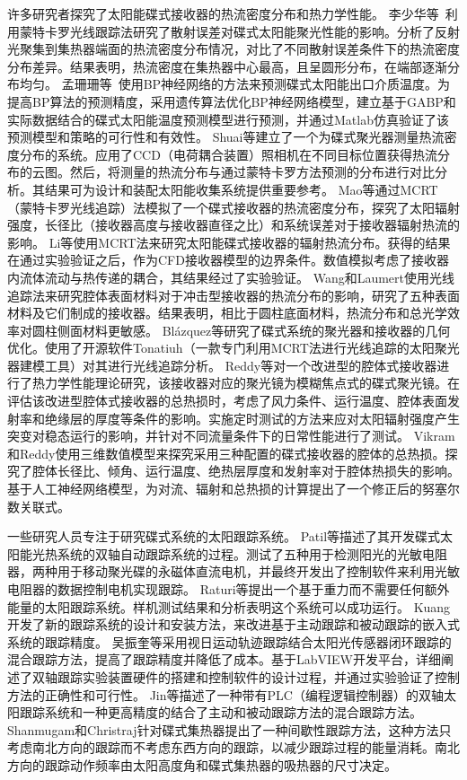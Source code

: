 许多研究者探究了太阳能碟式接收器的热流密度分布和热力学性能。
李少华等~\cite{Li2017}利用蒙特卡罗光线跟踪法研究了散射误差对碟式太阳能聚光性能的影响。分析了反射光聚集到集热器端面的热流密度分布情况，对比了不同散射误差条件下的热流密度分布差异。结果表明，热流密度在集热器中心最高，且呈圆形分布，在端部逐渐分布均匀。
孟珊珊等~\cite{Meng2016}使用BP神经网络的方法来预测碟式太阳能出口介质温度。为提高BP算法的预测精度，采用遗传算法优化BP神经网络模型，建立基于GABP和实际数据结合的碟式太阳能温度预测模型进行预测，并通过Matlab仿真验证了该预测模型和策略的可行性和有效性。
Shuai等\cite{Shuai2010}建立了一个为碟式聚光器测量热流密度分布的系统。应用了CCD（电荷耦合装置）照相机在不同目标位置获得热流分布的云图。然后，将测量的热流分布与通过蒙特卡罗方法预测的分布进行对比分析。其结果可为设计和装配太阳能收集系统提供重要参考。
Mao等\cite{Mao2014b}通过MCRT（蒙特卡罗光线追踪）法模拟了一个碟式接收器的热流密度分布，探究了太阳辐射强度，长径比（接收器高度与接收器直径之比）和系统误差对于接收器辐射热流的影响。
Li等\cite{Li2011b}使用MCRT法来研究太阳能碟式接收器的辐射热流分布。获得的结果在通过实验验证之后，作为CFD接收器模型的边界条件。数值模拟考虑了接收器内流体流动与热传递的耦合，其结果经过了实验验证。
Wang和Laumert\cite{Wang2017}使用光线追踪法来研究腔体表面材料对于冲击型接收器的热流分布的影响，研究了五种表面材料及它们制成的接收器。结果表明，相比于圆柱底面材料，热流分布和总光学效率对圆柱侧面材料更敏感。
Bl\'{a}zquez等\cite{Blazquez2016}研究了碟式系统的聚光器和接收器的几何优化。使用了开源软件Tonatiuh（一款专门利用MCRT法进行光线追踪的太阳聚光器建模工具）对其进行光线追踪分析。
Reddy等\cite{Reddy2015,Reddy2015b}对一个改进型的腔体式接收器进行了热力学性能理论研究，该接收器对应的聚光镜为模糊焦点式的碟式聚光镜。在评估该改进型腔体式接收器的总热损时，考虑了风力条件、运行温度、腔体表面发射率和绝缘层的厚度等条件的影响。实施定时测试的方法来应对太阳辐射强度产生突变对稳态运行的影响，并针对不同流量条件下的日常性能进行了测试。
Vikram和Reddy\cite{Vikram2015}使用三维数值模型来探究采用三种配置的碟式接收器的腔体的总热损。探究了腔体长径比、倾角、运行温度、绝热层厚度和发射率对于腔体热损失的影响。基于人工神经网络模型，为对流、辐射和总热损的计算提出了一个修正后的努塞尔数关联式。

一些研究人员专注于研究碟式系统的太阳跟踪系统。
Patil等\cite{Patil2016}描述了其开发碟式太阳能光热系统的双轴自动跟踪系统的过程。测试了五种用于检测阳光的光敏电阻器，两种用于移动聚光碟的永磁体直流电机，并最终开发出了控制软件来利用光敏电阻器的数据控制电机实现跟踪。
Raturi等\cite{Raturi2014}提出一个基于重力而不需要任何额外能量的太阳跟踪系统。样机测试结果和分析表明这个系统可以成功运行。
Kuang\cite{Kuang2012}开发了新的跟踪系统的设计和安装方法，来改进基于主动跟踪和被动跟踪的嵌入式系统的跟踪精度。
吴振奎等\cite{Wu2015}采用视日运动轨迹跟踪结合太阳光传感器闭环跟踪的混合跟踪方法，提高了跟踪精度并降低了成本。基于LabVIEW开发平台，详细阐述了双轴跟踪实验装置硬件的搭建和控制软件的设计过程，并通过实验验证了控制方法的正确性和可行性。
Jin等\cite{Jin2013}描述了一种带有PLC（编程逻辑控制器）的双轴太阳跟踪系统和一种更高精度的结合了主动和被动跟踪方法的混合跟踪方法。
Shanmugam和Christraj\cite{Shanmugam2005}针对碟式集热器提出了一种间歇性跟踪方法，这种方法只考虑南北方向的跟踪而不考虑东西方向的跟踪，以减少跟踪过程的能量消耗。南北方向的跟踪动作频率由太阳高度角和碟式集热器的吸热器的尺寸决定。

